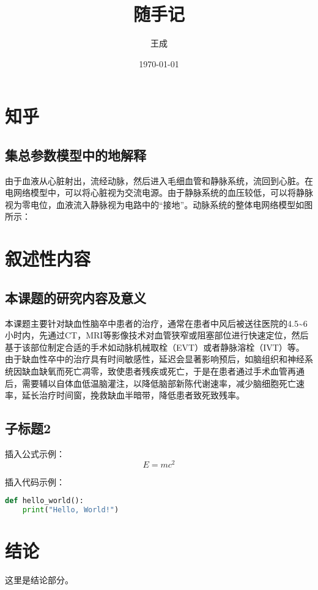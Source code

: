 \documentclass[12pt,a4paper]{article} %
\title{随手记} %
\author{王成} %
\date{\today} %
\begin{document}
\maketitle %

\section{知乎}
\subsection{集总参数模型中的地解释}
\colorbox{yellow!20}{
    \parbox{\dimexpr\linewidth-2\fboxsep}{
        由于血液从心脏射出，流经动脉，然后进入毛细血管和静脉系统，流回到心脏。在电网络模型中，可以将心脏视为交流电源。由于静脉系统的血压较低，可以将静脉视为零电位，血液流入静脉视为电路中的“接地”。动脉系统的整体电网络模型如图所示：
    }
}

\section{叙述性内容}
\subsection{本课题的研究内容及意义}
本课题主要针对缺血性脑卒中患者的治疗，通常在患者中风后被送往医院的4.5\textasciitilde6小时内，先通过CT，MRI等影像技术对血管狭窄或阻塞部位进行快速定位，然后基于该部位制定合适的手术如动脉机械取栓（EVT）或者静脉溶栓（IVT）等。
由于缺血性卒中的治疗具有时间敏感性，延迟会显著影响预后，如脑组织和神经系统因缺血缺氧而死亡凋零，致使患者残疾或死亡，于是在患者通过手术血管再通后，需要辅以自体血低温脑灌注，以降低脑部新陈代谢速率，减少脑细胞死亡速率，延长治疗时间窗，挽救缺血半暗带，降低患者致死致残率。

\subsection{子标题2}
插入公式示例：
\begin{equation}
    E = mc^2
\end{equation}



插入代码示例：
\begin{lstlisting}[language=Python, caption=Python代码示例]
def hello_world():
    print("Hello, World!")
\end{lstlisting}

\section{结论}
这里是结论部分。
\end{document}
